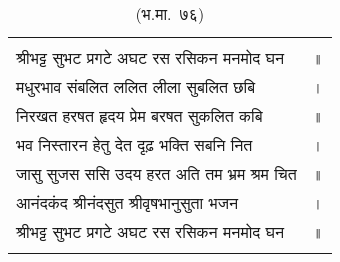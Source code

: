 {\bfseries
\setlength{\mylenone}{0pt}
\settowidth{\mylentwo}{श्रीभट्ट सुभट प्रगटे अघट रस रसिकन मनमोद घन}
\setlength{\mylenone}{\maxof{\mylenone}{\mylentwo}}
\settowidth{\mylentwo}{मधुरभाव संबलित ललित लीला सुबलित छबि}
\setlength{\mylenone}{\maxof{\mylenone}{\mylentwo}}
\settowidth{\mylentwo}{निरखत हरषत हृदय प्रेम बरषत सुकलित कबि}
\setlength{\mylenone}{\maxof{\mylenone}{\mylentwo}}
\settowidth{\mylentwo}{भव निस्तारन हेतु देत दृढ़ भक्ति सबनि नित}
\setlength{\mylenone}{\maxof{\mylenone}{\mylentwo}}
\settowidth{\mylentwo}{जासु सुजस ससि उदय हरत अति तम भ्रम श्रम चित}
\setlength{\mylenone}{\maxof{\mylenone}{\mylentwo}}
\settowidth{\mylentwo}{आनंदकंद श्रीनंदसुत श्रीवृषभानुसुता भजन}
\setlength{\mylenone}{\maxof{\mylenone}{\mylentwo}}
\settowidth{\mylentwo}{श्रीभट्ट सुभट प्रगटे अघट रस रसिकन मनमोद घन}
\setlength{\mylenone}{\maxof{\mylenone}{\mylentwo}}
\setlength{\mylentwo}{\baselineskip}
\setlength{\mylenone}{\mylenone + 1pt}
\begin{longtable}[l]{@{\hspace*{\mylen}}>{\setlength\parfillskip{0pt}}p{\mylenone}@{}@{}l@{}}
 & \\[-\the\mylentwo]
श्रीभट्ट सुभट प्रगटे अघट रस रसिकन मनमोद घन & ॥\\ \nopagebreak
मधुरभाव संबलित ललित लीला सुबलित छबि & ।\\ \nopagebreak
निरखत हरषत हृदय प्रेम बरषत सुकलित कबि & ॥\\
भव निस्तारन हेतु देत दृढ़ भक्ति सबनि नित & ।\\ \nopagebreak
जासु सुजस ससि उदय हरत अति तम भ्रम श्रम चित & ॥\\
आनंदकंद श्रीनंदसुत श्रीवृषभानुसुता भजन & ।\\ \nopagebreak
श्रीभट्ट सुभट प्रगटे अघट रस रसिकन मनमोद घन & ॥\\ \nopagebreak
\caption*{(भ.मा.~७६)}
\end{longtable}
}

